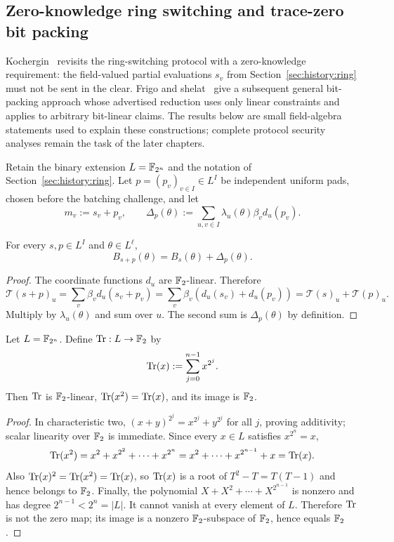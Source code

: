 \subsection{Zero-knowledge ring switching and trace-zero bit packing}\label{sec:history:zkbit}

Kochergin~\cite{Kochergin2026} revisits the ring-switching protocol with a zero-knowledge requirement: the field-valued partial evaluations $s_v$ from Section~\ref{sec:history:ring} must not be sent in the clear. Frigo and shelat~\cite{FrigoShelat2026} give a subsequent general bit-packing approach whose advertised reduction uses only linear constraints and applies to arbitrary bit-linear claims. The results below are small field-algebra statements used to explain these constructions; complete protocol security analyses remain the task of the later chapters.

\begin{definition}\label{def:history:ringmask}
Retain the binary extension $L=\mathbb{F}_{2^n}$ and the notation of Section~\ref{sec:history:ring}. Let $p=(p_v)_{v\in I}\in L^I$ be independent uniform pads, chosen before the batching challenge, and let
\[
 m_v:=s_v+p_v,\qquad
 \Delta_p(\theta):=\sum_{u,v\in I}\lambda_u(\theta)\beta_vd_u(p_v).
\]
\end{definition}

\begin{lemma}\label{lem:history:maskadditivity}
For every $s,p\in L^I$ and $\theta\in L^\ell$,
\[
 B_{s+p}(\theta)=B_s(\theta)+\Delta_p(\theta).
\]
\end{lemma}
\begin{proof}
The coordinate functions $d_u$ are $\mathbb{F}_2$-linear. Therefore
\[
 \mathcal T(s+p)_u
 =\sum_v\beta_vd_u(s_v+p_v)
 =\sum_v\beta_v(d_u(s_v)+d_u(p_v))
 =\mathcal T(s)_u+\mathcal T(p)_u.
\]
Multiply by $\lambda_u(\theta)$ and sum over $u$. The second sum is $\Delta_p(\theta)$ by definition.
\end{proof}

\begin{lemma}\label{lem:history:trace}
Let $L=\mathbb{F}_{2^n}$. Define $\operatorname{Tr}:L\to\mathbb{F}_2$ by
\[
 \operatorname{Tr}(x):=\sum_{j=0}^{n-1}x^{2^j}.
\]
Then $\operatorname{Tr}$ is $\mathbb{F}_2$-linear, $\operatorname{Tr}(x^2)=\operatorname{Tr}(x)$, and its image is $\mathbb{F}_2$.
\end{lemma}
\begin{proof}
In characteristic two, $(x+y)^{2^j}=x^{2^j}+y^{2^j}$ for all $j$, proving additivity; scalar linearity over $\mathbb{F}_2$ is immediate. Since every $x\in L$ satisfies $x^{2^n}=x$,
\[
 \operatorname{Tr}(x^2)=x^2+x^{2^2}+\cdots+x^{2^n}
 =x^2+\cdots+x^{2^{n-1}}+x=\operatorname{Tr}(x).
\]
Also $\operatorname{Tr}(x)^2=\operatorname{Tr}(x^2)=\operatorname{Tr}(x)$, so $\operatorname{Tr}(x)$ is a root of $T^2-T=T(T-1)$ and hence belongs to $\mathbb{F}_2$. Finally, the polynomial $X+X^2+\cdots+X^{2^{n-1}}$ is nonzero and has degree $2^{n-1}<2^n=|L|$. It cannot vanish at every element of $L$. Therefore $\operatorname{Tr}$ is not the zero map; its image is a nonzero $\mathbb{F}_2$-subspace of $\mathbb{F}_2$, hence equals $\mathbb{F}_2$.
\end{proof}

